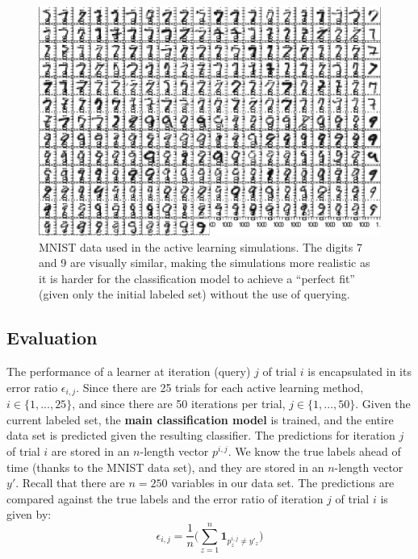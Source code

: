 \tablespacing
\begin{figure}[H]
	\begin{center}
		\includegraphics[width=1\linewidth]{ch-al/figures/data.pdf}
		\caption[MNIST data used in the active learning simulations.]{MNIST 
		data used in the active learning
		simulations. The digits 7 and 9 are visually similar, making 
		the simulations more realistic as it is harder for the classification 
		model to achieve a ``perfect fit'' (given only the initial labeled set) 
		without the use of querying.}
		\label{fig:al:simulations:data}
	\end{center}
\end{figure}
\bodyspacing

\subsection{Evaluation}
\label{sec:al:simulation:evaluation}
The performance of a learner at iteration (query) $j$ of trial $i$ is 
encapsulated in its error ratio $\epsilon_{i, j}$. Since there are 25 trials 
for each active learning method, $i \in \{1,...,25\}$, and since there are 50 
iterations per trial, $j \in \{1,...,50\}$. 
Given the current labeled set, the 
\textbf{main classification model} is trained, and the entire data set is 
predicted given the resulting classifier. The predictions for iteration $j$ of 
trial $i$ are stored in an $n$-length vector $p^{i,j}$. 
We know the true labels ahead of time (thanks to the MNIST data set), and they 
are stored in an $n$-length vector $y'$. Recall that there are $n = 250$ 
variables in our data set. The predictions are compared against 
the true labels and the error ratio of iteration $j$ of trial $i$ is given by:
$$\epsilon_{i,j} = \frac{1}{n} \bigg( \sum\limits_{z=1}^{n} 
\textbf{1}_{p^{i,j}_z \neq y'_z} \bigg)$$

